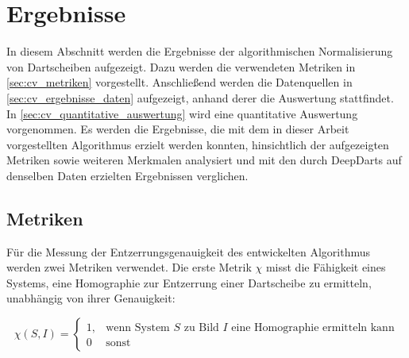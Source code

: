 
\section{Ergebnisse}
\label{sec:cv:ergebnisse}

In diesem Abschnitt werden die Ergebnisse der algorithmischen Normalisierung von Dartscheiben aufgezeigt. Dazu werden die verwendeten Metriken in \autoref{sec:cv_metriken} vorgestellt. Anschließend werden die Datenquellen in \autoref{sec:cv_ergebnisse_daten} aufgezeigt, anhand derer die Auswertung stattfindet. In \autoref{sec:cv_quantitative_auswertung} wird eine quantitative Auswertung vorgenommen. Es werden die Ergebnisse, die mit dem in dieser Arbeit vorgestellten Algorithmus erzielt werden konnten, hinsichtlich der aufgezeigten Metriken sowie weiteren Merkmalen analysiert und mit den durch DeepDarts auf denselben Daten erzielten Ergebnissen verglichen.


\vfill
\subsection{Metriken}
\label{sec:cv_metriken}

Für die Messung der Entzerrungsgenauigkeit des entwickelten Algorithmus werden zwei Metriken verwendet. Die erste Metrik $\chi$ misst die Fähigkeit eines Systems, eine Homographie zur Entzerrung einer Dartscheibe zu ermitteln, unabhängig von ihrer Genauigkeit:

\begin{equation*}
    \chi(S, I) =
    \begin{cases}
        1, & \text{wenn System $S$ zu Bild $I$ eine Homographie ermitteln kann} \\
        0  & \text{sonst}
    \end{cases}
\end{equation*}

